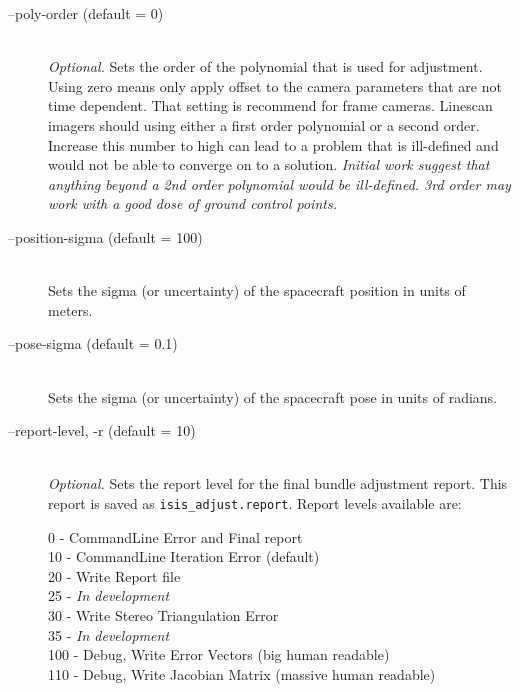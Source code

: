 \begin{description}
\item[--poly-order \textnormal{\small{(default = 0)}}] \hfill \\
  \emph{Optional.} Sets the order of the polynomial that is used for
  adjustment. Using zero means only apply offset to the camera
  parameters that are not time dependent. That setting is recommend
  for frame cameras. Linescan imagers should using either a first
  order polynomial or a second order. Increase this number to high can
  lead to a problem that is ill-defined and would not be able to
  converge on to a solution. \emph{Initial work suggest that anything
    beyond a 2nd order polynomial would be ill-defined. 3rd order may
    work with a good dose of ground control points.}

\item[--position-sigma \textnormal{\small{(default = 100)}}] \hfill \\
  Sets the sigma (or uncertainty) of the spacecraft position in
  units of meters.

\item[--pose-sigma \textnormal{\small{(default = 0.1)}}] \hfill \\
  Sets the sigma (or uncertainty) of the spacecraft pose in units
  of radians.

\item[--report-level, -r \textnormal{\small{(default = 10)}}] \hfill \\
  \emph{Optional.} Sets the report level for the final bundle
  adjustment report.  This report is saved as
  \texttt{isis\_adjust.report}. Report levels available are:

  \begin{description}
    \item[0   - CommandLine Error and Final report]
    \item[10  - CommandLine Iteration Error (default)]
    \item[20  - Write Report file]
    \item[25  - \textnormal{\emph{In development}}]
    \item[30  - Write Stereo Triangulation Error]
    \item[35  - \textnormal{\emph{In development}}]
    \item[100 - Debug, Write Error Vectors (big human readable)]
    \item[110 - Debug, Write Jacobian Matrix (massive human readable)]
  \end{description}


\end{description}
